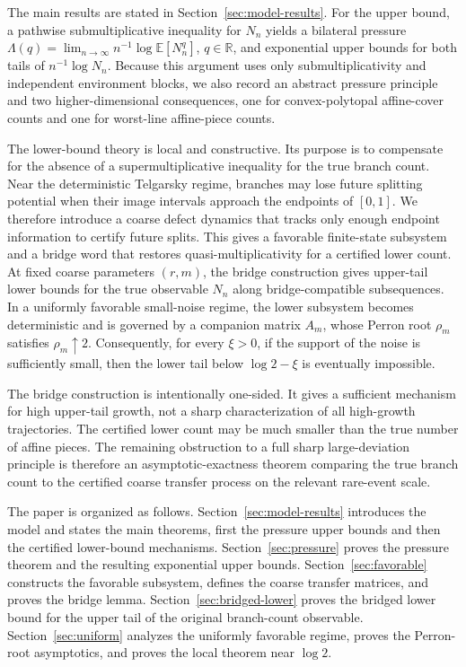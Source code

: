 \documentclass[11pt]{amsart}
\numberwithin{equation}{section}
\theoremstyle{plain}
\theoremstyle{definition}
\theoremstyle{remark}
\begin{document}
The main results are stated in Section~\ref{sec:model-results}. For the upper bound, a pathwise submultiplicative inequality for \(N_n\) yields a bilateral pressure \(\Lambda(q)=\lim_{n\to\infty} n^{-1}\log \mathbb E[N_n^q]\), \(q\in\mathbb R\), and exponential upper bounds for both tails of \(n^{-1}\log N_n\). Because this argument uses only submultiplicativity and independent environment blocks, we also record an abstract pressure principle and two higher-dimensional consequences, one for convex-polytopal affine-cover counts and one for worst-line affine-piece counts.

The lower-bound theory is local and constructive. Its purpose is to compensate for the absence of a supermultiplicative inequality for the true branch count. Near the deterministic Telgarsky regime, branches may lose future splitting potential when their image intervals approach the endpoints of \([0,1]\). We therefore introduce a coarse defect dynamics that tracks only enough endpoint information to certify future splits. This gives a favorable finite-state subsystem and a bridge word that restores quasi-multiplicativity for a certified lower count. At fixed coarse parameters \((r,m)\), the bridge construction gives upper-tail lower bounds for the true observable \(N_n\) along bridge-compatible subsequences. In a uniformly favorable small-noise regime, the lower subsystem becomes deterministic and is governed by a companion matrix \(A_m\), whose Perron root \(\rho_m\) satisfies \(\rho_m\uparrow 2\). Consequently, for every \(\xi>0\), if the support of the noise is sufficiently small, then the lower tail below \(\log 2-\xi\) is eventually impossible.

The bridge construction is intentionally one-sided. It gives a sufficient mechanism for high upper-tail growth, not a sharp characterization of all high-growth trajectories. The certified lower count may be much smaller than the true number of affine pieces. The remaining obstruction to a full sharp large-deviation principle is therefore an asymptotic-exactness theorem comparing the true branch count to the certified coarse transfer process on the relevant rare-event scale.

The paper is organized as follows. Section~\ref{sec:model-results} introduces the model and states the main theorems, first the pressure upper bounds and then the certified lower-bound mechanisms.  Section~\ref{sec:pressure} proves the pressure theorem and the resulting exponential upper bounds. Section~\ref{sec:favorable} constructs the favorable subsystem, defines the coarse transfer matrices, and proves the bridge lemma. Section~\ref{sec:bridged-lower} proves the bridged lower bound for the upper tail of the original branch-count observable. Section~\ref{sec:uniform} analyzes the uniformly favorable regime, proves the Perron-root asymptotics, and proves the local theorem near \(\log 2\).
\end{document}
